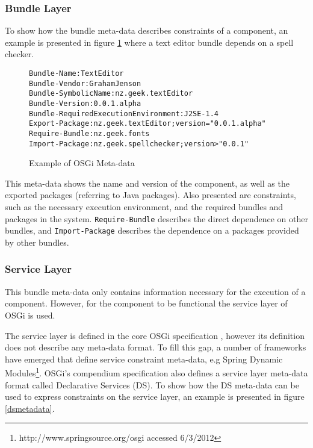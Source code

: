 \subsubsection{Bundle Layer}
To show how the bundle meta-data describes constraints of a component,
an example is presented in figure \ref{osgibundle} where a text editor bundle depends on a spell checker.
\begin{figure}[htp]
\begin{center}
\begin{alltt}
Bundle-Name: TextEditor
Bundle-Vendor: Graham Jenson
Bundle-SymbolicName: nz.geek.textEditor
Bundle-Version: 0.0.1.alpha
Bundle-RequiredExecutionEnvironment: J2SE-1.4
Export-Package: nz.geek.textEditor;version="0.0.1.alpha"
Require-Bundle: nz.geek.fonts
Import-Package: nz.geek.spellchecker;version>"0.0.1"
\end{alltt}
  \caption{Example of OSGi Meta-data}
  \label{osgibundle}
\end{center}
\end{figure}

This meta-data shows the name and version of the component, as well as the exported packages (referring to Java packages).
Also presented are constraints, such as the necessary execution environment, and the required bundles and packages in the system.
\texttt{Require-Bundle} describes the direct dependence on other bundles, and
\texttt{Import-Package} describes the dependence on a packages provided by other bundles.

\subsubsection{Service Layer}
This bundle meta-data only contains information necessary for the execution of a component.
However, for the component to be functional the service layer of OSGi is used.

The service layer is defined in the core OSGi specification \citep{osgicore2007}, however its definition does not describe any meta-data format.
To fill this gap, a number of frameworks have emerged that define service constraint meta-data, e.g
Spring Dynamic Modules\footnote{http://www.springsource.org/osgi accessed 6/3/2012}.
OSGi's compendium specification \citep{osgicompendium2007} also defines a service layer meta-data format called Declarative Services (DS).
To show how the DS meta-data can be used to express constraints on the service layer,
an example is presented in figure \ref{dsmetadata}.

